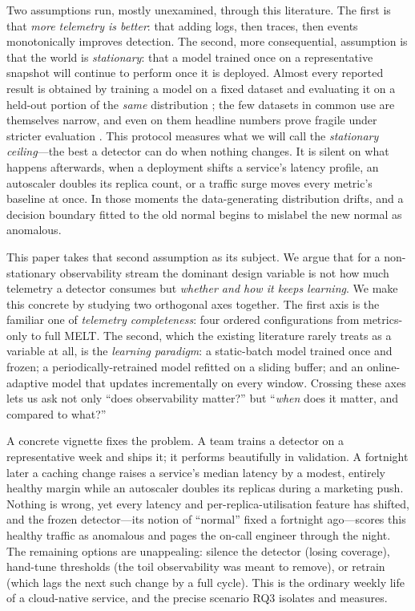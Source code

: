 \documentclass[pdflatex,sn-mathphys-num]{sn-jnl}%
\theoremstyle{thmstyleone}%
\theoremstyle{thmstyletwo}%
\theoremstyle{thmstylethree}%
\begin{document}
Two assumptions run, mostly unexamined, through this literature. The first is that \emph{more telemetry is better}: that adding logs, then traces, then events monotonically improves detection. The second, more consequential, assumption is that the world is \emph{stationary}: that a model trained once on a representative snapshot will continue to perform once it is deployed. Almost every reported result is obtained by training a model on a fixed dataset and evaluating it on a held-out portion of the \emph{same} distribution \cite{lomio2022,dkmak2025,han2024}; the few datasets in common use are themselves narrow, and even on them headline numbers prove fragile under stricter evaluation \cite{landauer2022logsurvey,sarfraz2024quovadis}. This protocol measures what we will call the \emph{stationary ceiling}---the best a detector can do when nothing changes. It is silent on what happens afterwards, when a deployment shifts a service's latency profile, an autoscaler doubles its replica count, or a traffic surge moves every metric's baseline at once. In those moments the data-generating distribution drifts, and a decision boundary fitted to the old normal begins to mislabel the new normal as anomalous.

This paper takes that second assumption as its subject. We argue that for a non-stationary observability stream the dominant design variable is not how much telemetry a detector consumes but \emph{whether and how it keeps learning}. We make this concrete by studying two orthogonal axes together. The first axis is the familiar one of \emph{telemetry completeness}: four ordered configurations from metrics-only to full MELT. The second, which the existing literature rarely treats as a variable at all, is the \emph{learning paradigm}: a static-batch model trained once and frozen; a periodically-retrained model refitted on a sliding buffer; and an online-adaptive model that updates incrementally on every window. Crossing these axes lets us ask not only ``does observability matter?'' but ``\emph{when} does it matter, and compared to what?''

A concrete vignette fixes the problem. A team trains a detector on a representative week and ships it; it performs beautifully in validation. A fortnight later a caching change raises a service's median latency by a modest, entirely healthy margin while an autoscaler doubles its replicas during a marketing push. Nothing is wrong, yet every latency and per-replica-utilisation feature has shifted, and the frozen detector---its notion of ``normal'' fixed a fortnight ago---scores this healthy traffic as anomalous and pages the on-call engineer through the night. The remaining options are unappealing: silence the detector (losing coverage), hand-tune thresholds (the toil observability was meant to remove), or retrain (which lags the next such change by a full cycle). This is the ordinary weekly life of a cloud-native service, and the precise scenario RQ3 isolates and measures.
\end{document}

